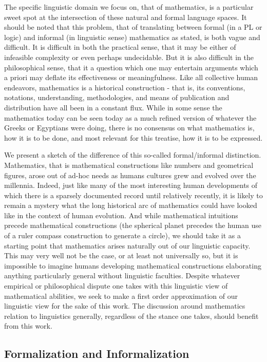 The specific linguistic domain we focus on, that of mathematics, is a particular
sweet spot at the intersection of these natural and formal language spaces. It should be
noted that this problem, that of translating between formal (in a PL or logic)
and informal (in linguistic sense) mathematics as stated, is both vague and
difficult. It is difficult in both the practical sense, that it may be
either of infeasible complexity or even perhaps undecidable. But it is also
difficult in the philosophical sense, that it a question which one may entertain
arguments which a priori may deflate its effectiveness or meaningfulness.
Like all collective human endeavors, mathematics is a historical
construction - that is, its conventions, notations, understanding,
methodologies, and means of publication and distribution have all been in a
constant flux. While in some sense the mathematics today can be seen today as a
much refined version of whatever the Greeks or Egyptians were doing, there is no
consensus on what mathematics is, how it is to be done, and most relevant for
this treatise, how it is to be expressed.

We present a sketch of the difference of this so-called formal/informal
distinction. Mathematics, that is mathematical constructions like numbers and
geometrical figures, arose out of ad-hoc needs as humans cultures grew and
evolved over the millennia. Indeed, just like many of the most interesting human
developments of which there is a sparsely documented record until relatively
recently, it is likely to remain a mystery what the long historical arc of
mathematics could have looked like in the context of human evolution. And while
mathematical intuitions precede mathematical constructions (the spherical planet
precedes the human use of a ruler compass construction to generate a circle), we
should take it as a starting point that mathematics arises naturally out of our
linguistic capacity. This may very well not be the case, or at least not
universally so, but it is impossible to imagine humans developing mathematical
constructions elaborating anything particularly general without linguistic
faculties. Despite whatever empirical or philosophical dispute one takes with
this linguistic view of mathematical abilities, we seek to make a first order
approximation of our linguistic view for the sake of this work. The discussion around
mathematics relation to linguistics generally, regardless of the stance
one takes, should benefit from this work.

\subsection{Formalization and Informalization}


